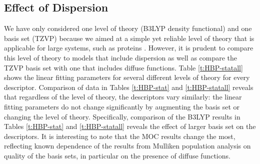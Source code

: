 \documentclass[11pt]{report}
\begin{document}
\subsection{Effect of Dispersion}
\label{ss:HBP-Dispersion}

We have only considered one level of theory (B3LYP density functional) and one basis set (TZVP) because we aimed at a simple yet reliable level of theory that is applicable for large systems, such as proteins
\cite{Ayoub2014}. 
However, it is prudent to compare this level of theory to models that include dispersion as well as compare the TZVP basis set with one that includes diffuse functions. 
Table \ref{t:HBP-statall} shows the linear fitting parameters for several different levels of
theory for every descriptor. Comparison of data in Tables 
\ref{t:HBP-stat} and \ref{t:HBP-statall} 
reveals that regardless of the level of theory, the descriptors vary similarly: the linear fitting parameters do not change significantly by augmenting the basis set or changing the level of theory. Specifically, comparison of
the B3LYP results in 
Tables \ref{t:HBP-stat} and \ref{t:HBP-statall}
reveals the effect of larger basis set on the descriptors. It is interesting to note that the MOC results change the most, reflecting known dependence of the results from Mulliken population analysis on quality of the basis sets, in particular on the presence of diffuse functions.
\end{document}
